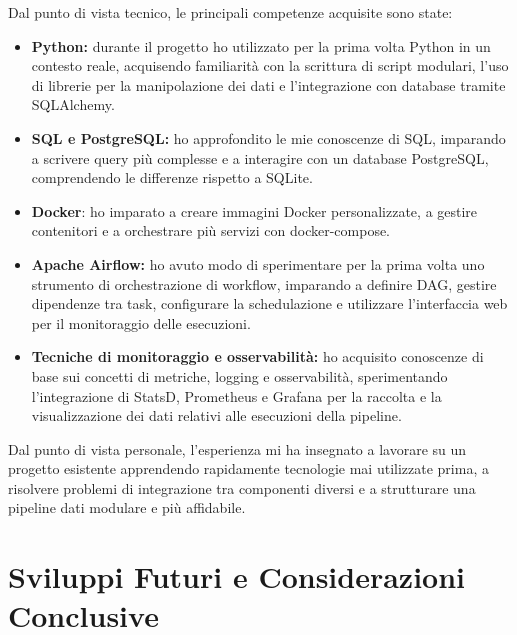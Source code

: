 Dal punto di vista tecnico, le principali competenze acquisite sono state:

\begin{itemize}
    \item \textbf{Python:} durante il progetto ho utilizzato per la prima volta Python in un contesto 
    reale, acquisendo familiarità con la scrittura di script modulari, l’uso di librerie per la manipolazione 
    dei dati e l’integrazione con database tramite SQLAlchemy.
    \item \textbf{SQL e PostgreSQL:} ho approfondito le mie conoscenze di SQL, imparando a scrivere query 
    più complesse e a interagire con un database PostgreSQL, comprendendo le differenze rispetto a SQLite.
    \item \textbf{Docker}: ho imparato a creare immagini Docker personalizzate, a gestire contenitori 
    e a orchestrare più servizi con docker-compose.
    \item \textbf{Apache Airflow:} ho avuto modo di sperimentare per la prima volta uno strumento 
    di orchestrazione di workflow, imparando a definire DAG, gestire dipendenze tra task, 
    configurare la schedulazione e utilizzare l’interfaccia web per il monitoraggio delle esecuzioni.
    \item \textbf{Tecniche di monitoraggio e osservabilità:} ho acquisito conoscenze di base sui concetti 
    di metriche, logging e osservabilità, sperimentando l’integrazione di StatsD, Prometheus e Grafana 
    per la raccolta e la visualizzazione dei dati relativi alle esecuzioni della pipeline.
\end{itemize}

Dal punto di vista personale, l’esperienza mi ha insegnato a lavorare su un progetto esistente 
apprendendo rapidamente tecnologie mai utilizzate prima, a risolvere problemi di integrazione tra 
componenti diversi e a strutturare una pipeline dati modulare e più affidabile. 

\section{Sviluppi Futuri e Considerazioni Conclusive}
\label{sec:sviluppifuturiconsiderazioniconglusive}


